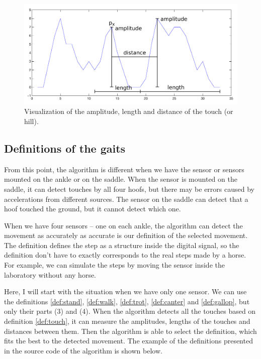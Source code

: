 \begin{figure}
	\centering
	\label{fig:touchProperties}
	\caption{Visualization of the amplitude, length and distance of the touch (or hill).}
	\includegraphics[width=\linewidth]{img/touchHillProperties.pdf}
\end{figure}

\subsection{Definitions of the gaits}
From this point, the algorithm is different when we have the sensor or sensors mounted on the ankle or on the saddle. When the sensor is mounted on the saddle, it can detect touches by all four hoofs, but there may be errors caused by accelerations from different sources. The sensor on the saddle can detect that a hoof touched the ground, but it cannot detect which one.

When we have four sensors -- one on each ankle, the algorithm can detect the movement as accurately as accurate is our definition of the selected movement. The definition defines the step as a structure inside the digital signal, so the definition don't have to exactly corresponds to the real steps made by a horse. For example, we can simulate the steps by moving the sensor inside the laboratory without any horse.

Here, I will start with the situation when we have only one sensor. We can use the definitions \ref{def:stand}, \ref{def:walk}, \ref{def:trot}, \ref{def:canter} and \ref{def:gallop}, but only their parts (3) and (4). When the algorithm detects all the touches based on definition \ref{def:touch}, it can measure the amplitudes, lengths of the touches and distances between them. Then the algorithm is able to select the definition, which fits the best to the detected movement. The example of the definitions presented in the source code of the algorithm is shown below.

